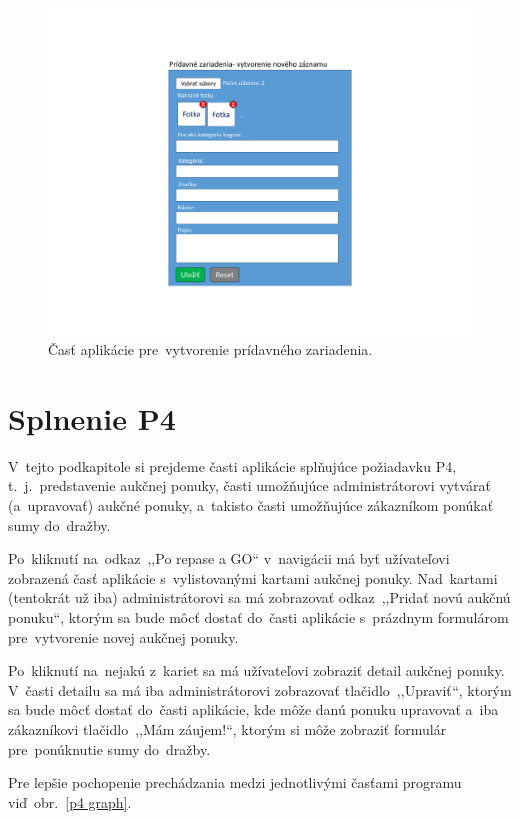 \begin{figure}[H]\centering
\includegraphics[width=140mm]{../img/UI concept/additional equipment form}
\caption{Časť aplikácie pre~vytvorenie prídavného zariadenia.}
\label{additional equipment form}
\end{figure}

\section{Splnenie P4}

V~tejto podkapitole si prejdeme časti aplikácie splňujúce požiadavku P4, t.~j.~predstavenie aukčnej ponuky, časti umožňujúce administrátorovi vytvárať (a~upravovať) aukčné ponuky, a~takisto časti umožňujúce zákazníkom ponúkať sumy do~dražby.

Po~kliknutí na~odkaz~,,Po repase a GO`` v~navigácii má byť užívateľovi zobrazená časť aplikácie s~vylistovanými kartami aukčnej ponuky. Nad~kartami (tentokrát už iba) administrátorovi sa má zobrazovať odkaz~,,Pridať novú aukčnú ponuku``, ktorým sa bude môcť dostať do~časti aplikácie s~prázdnym formulárom pre~vytvorenie novej aukčnej ponuky.

Po~kliknutí na~nejakú z~kariet sa má užívateľovi zobraziť detail aukčnej ponuky. V~časti detailu sa má iba administrátorovi zobrazovať tlačidlo~,,Upraviť``, ktorým sa bude môcť dostať do~časti aplikácie, kde môže danú ponuku upravovať a~iba zákazníkovi tlačidlo~,,Mám záujem!``, ktorým si môže zobraziť formulár pre~ponúknutie sumy do~dražby.

Pre lepšie pochopenie prechádzania medzi jednotlivými časťami programu viď~obr.~\ref{p4 graph}.

